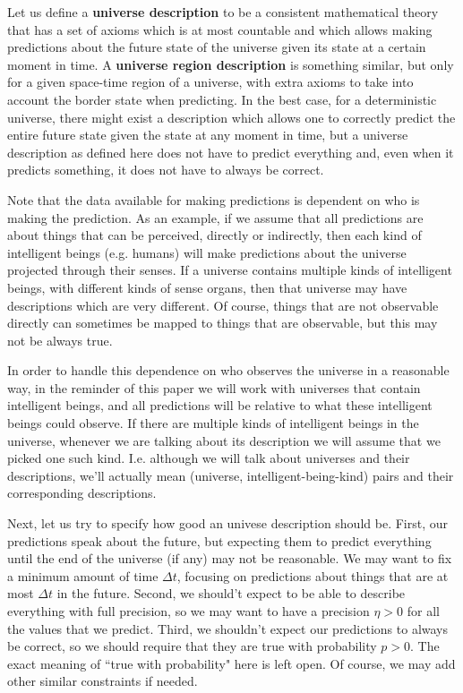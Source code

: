 \documentclass[a4paper
,draft
]{article}
\newcommand{\definitie}[1]{\textbf{#1}}
\newcommand{\ghilimele}[1]{``#1"}
\begin{document}
Let us define a \definitie{universe description} to be a
consistent mathematical theory that has
a set of axioms which is at most countable and which allows making
predictions about the future state of the universe given its state
at a certain moment in time. A \definitie{universe region description}
is something similar, but only for a given space-time region of a universe,
with extra axioms to take into account the border state when predicting.
In the best case, for a deterministic universe, there might exist
a description which allows one to correctly predict the entire future state
given the state at any moment in time, but a universe description
as defined here does not have to predict everything and,
even when it predicts something, it does not have to always be correct.

Note that the data available for making predictions is dependent
on who is making the prediction. As an example, if we assume that
all predictions are about things that can be perceived, directly or indirectly,
then
each kind of intelligent beings (e.g. humans) will make predictions
about the universe projected through their senses. If a universe contains
multiple kinds of intelligent beings, with different kinds of
sense organs, then that universe may have descriptions which are
very different.
Of course, things that are not observable directly can sometimes be mapped
to things that are observable, but this may not be always true.

In order to handle this dependence on who observes the universe
in a reasonable way, in the reminder of this paper we will work with universes
that contain intelligent beings,
and all predictions will be relative to what these intelligent beings
could observe.
If there are multiple kinds of intelligent beings in the
universe, whenever we are talking about its description
we will assume that we picked one such kind.
I.e. although we
will talk about universes and their descriptions, we'll actually mean
(universe, intelligent-being-kind) pairs and their corresponding descriptions.

Next, let us try to specify how good an univese description
should be. First, our predictions speak about the future, but expecting them to
predict everything until the end of the universe (if any) may not be
reasonable. We may want to fix a minimum amount of time $\Delta t$,
focusing on predictions about things that are at most
$\Delta t$ in the future. Second, we should't expect to
be able to describe everything with full precision, so we may want to
have a precision $\eta>0$ for all the values that we predict.
Third, we shouldn't expect our predictions to always be correct, so
we should require that they are true with probability $p>0$.
The exact meaning of \ghilimele{true with probability} here is left open.
Of course, we may add other similar constraints if needed.
\end{document}
